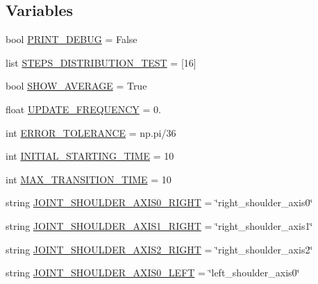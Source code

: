 \subsection*{Variables}
\begin{DoxyCompactItemize}
\item 
bool \mbox{\hyperlink{namespacesteering__test_a2ccc6db0fa9028bbbb4e80d065468571}{P\+R\+I\+N\+T\+\_\+\+D\+E\+B\+UG}} = False
\item 
list \mbox{\hyperlink{namespacesteering__test_acae0b4e9b394c1d048f12d3fa36b1c3b}{S\+T\+E\+P\+S\+\_\+\+D\+I\+S\+T\+R\+I\+B\+U\+T\+I\+O\+N\+\_\+\+T\+E\+ST}} = \mbox{[}16\mbox{]}
\item 
bool \mbox{\hyperlink{namespacesteering__test_a68d5476d0b261896aa167bfdcced5e56}{S\+H\+O\+W\+\_\+\+A\+V\+E\+R\+A\+GE}} = True
\item 
float \mbox{\hyperlink{namespacesteering__test_ac19b6fc64d5192dac159dbf45058eea4}{U\+P\+D\+A\+T\+E\+\_\+\+F\+R\+E\+Q\+U\+E\+N\+CY}} = 0.
\item 
int \mbox{\hyperlink{namespacesteering__test_a926ede48d33221fb98104e53427dad6d}{E\+R\+R\+O\+R\+\_\+\+T\+O\+L\+E\+R\+A\+N\+CE}} = np.\+pi/36
\item 
int \mbox{\hyperlink{namespacesteering__test_ad01a7718c0a1885ce7eaca4963687f65}{I\+N\+I\+T\+I\+A\+L\+\_\+\+S\+T\+A\+R\+T\+I\+N\+G\+\_\+\+T\+I\+ME}} = 10
\item 
int \mbox{\hyperlink{namespacesteering__test_a87ddce69e76f246064f5a5218c929ad9}{M\+A\+X\+\_\+\+T\+R\+A\+N\+S\+I\+T\+I\+O\+N\+\_\+\+T\+I\+ME}} = 10
\item 
string \mbox{\hyperlink{namespacesteering__test_a3150759114ba278a519ae1ed985cfba5}{J\+O\+I\+N\+T\+\_\+\+S\+H\+O\+U\+L\+D\+E\+R\+\_\+\+A\+X\+I\+S0\+\_\+\+R\+I\+G\+HT}} = \char`\"{}right\+\_\+shoulder\+\_\+axis0\char`\"{}
\item 
string \mbox{\hyperlink{namespacesteering__test_aaf66e63351381a6660d6abcf2f8e2474}{J\+O\+I\+N\+T\+\_\+\+S\+H\+O\+U\+L\+D\+E\+R\+\_\+\+A\+X\+I\+S1\+\_\+\+R\+I\+G\+HT}} = \char`\"{}right\+\_\+shoulder\+\_\+axis1\char`\"{}
\item 
string \mbox{\hyperlink{namespacesteering__test_a8e439db11a79057a1251ac0fb97f7c2b}{J\+O\+I\+N\+T\+\_\+\+S\+H\+O\+U\+L\+D\+E\+R\+\_\+\+A\+X\+I\+S2\+\_\+\+R\+I\+G\+HT}} = \char`\"{}right\+\_\+shoulder\+\_\+axis2\char`\"{}
\item 
string \mbox{\hyperlink{namespacesteering__test_afce3d76d6e62f8b452286a5bce89e101}{J\+O\+I\+N\+T\+\_\+\+S\+H\+O\+U\+L\+D\+E\+R\+\_\+\+A\+X\+I\+S0\+\_\+\+L\+E\+FT}} = \char`\"{}left\+\_\+shoulder\+\_\+axis0\char`\"{}

\end{DoxyCompactItemize}
